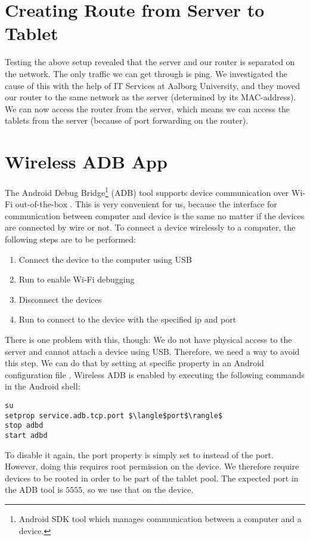 

\section{Creating Route from Server to Tablet}\label{sec:router_server_tablet}
Testing the above setup revealed that the server and our router is separated on the network. The only traffic we can get through is ping. We investigated the cause of this with the help of IT Services at Aalborg University, and they moved our router to the same network as the server (determined by its MAC-address). We can now access the router from the server, which means we can access the tablets from the server (because of port forwarding on the router).

\section{Wireless ADB App}\label{sec:wireless_adb}
The Android Debug Bridge\footnote{Android SDK tool which manages communication between a computer and a device.} (ADB) tool supports device communication over Wi-Fi out-of-the-box \parencite{AndroidADB}. This is very convenient for us, because the interface for communication between computer and device is the same no matter if the devices are connected by wire or not. To connect a device wirelessly to a computer, the following steps are to be performed:
\begin{enumerate}
  \item Connect the device to the computer using USB
  \item Run  to enable Wi-Fi debugging
  \item Disconnect the devices
  \item Run  to connect to the device with the specified ip and port
\end{enumerate}
There is one problem with this, though: We do not have physical access to the server and cannot attach a device using USB\@. Therefore, we need a way to avoid this step. We can do that by setting at specific property in an Android configuration file \parencite{stackoverflow-adb-tcp}. Wireless ADB is enabled by executing the following commands in the Android shell:
\begin{lstlisting}[mathescape]
su
setprop service.adb.tcp.port $\langle$port$\rangle$
stop adbd
start adbd
\end{lstlisting}
To disable it again, the port property is simply set to  instead of the port. However, doing this requires root permission on the device. We therefore require devices to be rooted in order to be part of the tablet pool. The expected port in the ADB tool is $5555$, so we use that on the device.


